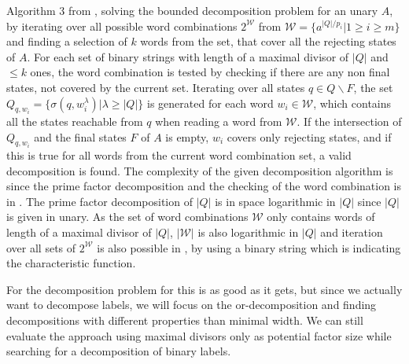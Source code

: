 Algorithm 3 from \cite{DBLP:journals/corr/abs-2107-04683}, solving the bounded decomposition problem for an unary \DFA $A$, by iterating over all possible word combinations $2^\mathcal{W}$ from  $\mathcal{W} = \{a^{|Q|/p_i} | 1 \geq i \geq m\}$ and finding a selection of $k$ words from the set, that cover all the rejecting states of $A$.
For each set of binary strings with length of a maximal divisor of $|Q|$ and $\leq k$ ones, the word combination is tested by checking if there are any non final states, not covered by the current set.
Iterating over all states $q \in Q \backslash F$, the set $Q_{q,w_i} = \{\sigma(q,w^\lambda_i)|\lambda \geq |Q|\}$ is generated for each word $w_i \in \mathcal{W}$, which contains all the states reachable from $q$ when reading a word from $\mathcal{W}$.
If the intersection of $Q_{q,w_i}$ and the final states $F$ of $A$ is empty, $w_i$ covers only rejecting states, and if this is true for all words from the current word combination set, a valid decomposition is found.
The complexity of the given decomposition algorithm is \LogSpace since the prime factor decomposition and the checking of the word combination is in \LogSpace.
The prime factor decomposition of $|Q|$ is in space logarithmic in $|Q|$ since $|Q|$ is given in unary.
As the set of word combinations $\mathcal{W}$ only contains words of length of a maximal divisor of $|Q|$, $|\mathcal{W}|$ is also logarithmic in $|Q|$ and iteration over all sets of $2^\mathcal{W}$ is also possible in \LogSpace, by using a binary string which is indicating the characteristic function.

For the decomposition problem for \DFAs this is as good as it gets, but since we actually want to decompose labels, we will focus on the or-decomposition and finding decompositions with different properties than minimal width. We can still evaluate the approach using maximal divisors only as potential factor size while searching for a decomposition of binary labels.
